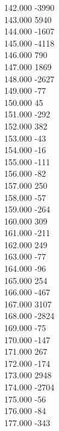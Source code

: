 { 142.000	-3990 \\
 143.000	5940 \\
 144.000	-1607 \\
 145.000	-4118 \\
 146.000	790 \\
 147.000	1869 \\
 148.000	-2627 \\
 149.000	-77 \\
 150.000	45 \\
 151.000	-292 \\
 152.000	382 \\
 153.000	-43 \\
 154.000	-16 \\
 155.000	-111 \\
 156.000	-82 \\
 157.000	250 \\
 158.000	-57 \\
 159.000	-264 \\
 160.000	309 \\
 161.000	-211 \\
 162.000	249 \\
 163.000	-77 \\
 164.000	-96 \\
 165.000	254 \\
 166.000	-467 \\
 167.000	3107 \\
 168.000	-2824 \\
 169.000	-75 \\
 170.000	-147 \\
 171.000	267 \\
 172.000	-174 \\
 173.000	2948 \\
 174.000	-2704 \\
 175.000	-56 \\
 176.000	-84 \\
 177.000	-343 \\
}
